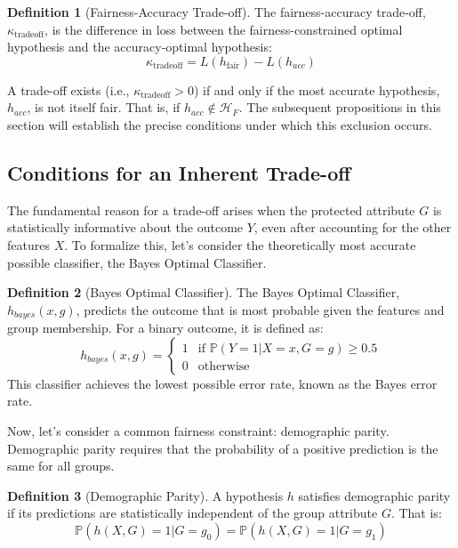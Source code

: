 \documentclass[12pt,a4paper]{article}
\theoremstyle{definition}
\newtheorem{definition}{Definition}
\theoremstyle{remark}
\begin{document}
\begin{definition}[Fairness-Accuracy Trade-off]
The fairness-accuracy trade-off, $\kappa_{\text{tradeoff}}$, is the difference in loss between the fairness-constrained optimal hypothesis and the accuracy-optimal hypothesis:
\begin{equation}
\kappa_{\text{tradeoff}} = L(h_{\text{fair}}) - L(h_{acc})
\end{equation}
\end{definition}

A trade-off exists (i.e., $\kappa_{\text{tradeoff}} > 0$) if and only if the most accurate hypothesis, $h_{acc}$, is not itself fair. That is, if $h_{acc} \notin \mathcal{H}_F$. The subsequent propositions in this section will establish the precise conditions under which this exclusion occurs.

\subsection{Conditions for an Inherent Trade-off}

The fundamental reason for a trade-off arises when the protected attribute $G$ is statistically informative about the outcome $Y$, even after accounting for the other features $X$. To formalize this, let's consider the theoretically most accurate possible classifier, the Bayes Optimal Classifier.

\begin{definition}[Bayes Optimal Classifier]
The Bayes Optimal Classifier, $h_{bayes}(x, g)$, predicts the outcome that is most probable given the features and group membership. For a binary outcome, it is defined as:
\begin{equation}
h_{bayes}(x, g) = 
\begin{cases} 
1 & \text{if } \mathbb{P}(Y=1 | X=x, G=g) \geq 0.5 \\
0 & \text{otherwise}
\end{cases}
\end{equation}
This classifier achieves the lowest possible error rate, known as the Bayes error rate.
\end{definition}

Now, let's consider a common fairness constraint: demographic parity. Demographic parity requires that the probability of a positive prediction is the same for all groups. 

\begin{definition}[Demographic Parity]
A hypothesis $h$ satisfies demographic parity if its predictions are statistically independent of the group attribute $G$. That is:
\begin{equation}
    \mathbb{P}(h(X,G)=1 | G=g_0) = \mathbb{P}(h(X,G)=1 | G=g_1)
\end{equation}
\end{definition}
\end{document}
